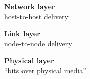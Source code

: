 \begin{frame}\begin{center}\large
\textbf{Network layer}\\ 
\large host-to-host delivery 
\end{center}\end{frame}

\begin{frame}\begin{center}\large\textbf{Link layer}\\ 
\large node-to-node delivery 
\end{center}\end{frame}

\begin{frame}\begin{center}\large
\textbf{Physical layer}\\\large ``bits over physical media'' 
\end{center}\end{frame}
